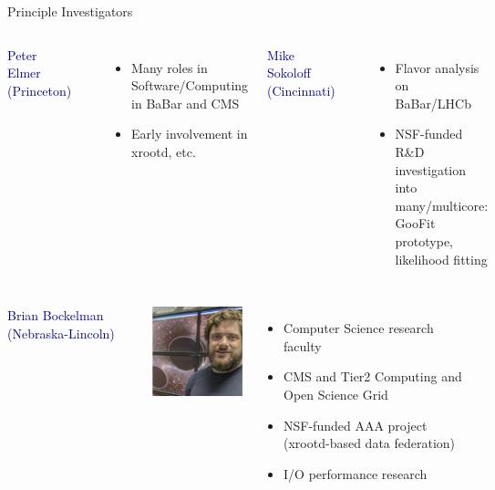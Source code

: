 \documentclass{beamer}
\begin{document}
\begin{frame}{Principle Investigators}
\scriptsize

\vfill

\begin{columns}[t]
\textcolor{darkblue}{Peter Elmer (Princeton)}
\begin{columns}
\includegraphics[height=2 cm]{peter_elmer.png}
\begin{itemize}
\item Many roles in Software/Computing in BaBar and CMS
\item Early involvement in xrootd, etc.
\end{itemize}
\end{columns}

\textcolor{darkblue}{Mike Sokoloff (Cincinnati)}
\begin{columns}
\includegraphics[height=2 cm]{mike_sokoloff.png}
\begin{itemize}
\item Flavor analysis on BaBar/LHCb
\item NSF-funded R\&D investigation into many/multicore: GooFit prototype, likelihood fitting
\end{itemize}
\end{columns}
\end{columns}

\vfill
\begin{columns}[t]
\textcolor{darkblue}{Brian Bockelman (Nebraska-Lincoln)}
\begin{columns}
\includegraphics[height=2 cm]{brian_bockelman.png}
\begin{itemize}
\item Computer Science research faculty
\item CMS and Tier2 Computing and Open Science Grid
\item NSF-funded AAA project (xrootd-based data federation)
\item I/O performance research
\end{itemize}
\end{columns}


\end{columns}
\end{frame}
\end{document}
